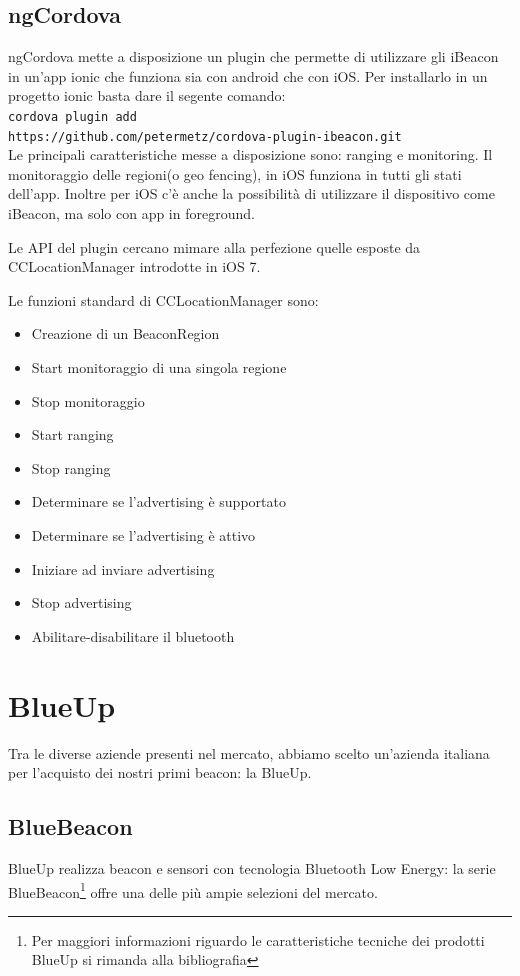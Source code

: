 \subsection{ngCordova}
ngCordova mette a disposizione un plugin che permette di utilizzare gli iBeacon in un'app ionic che funziona sia con android che con iOS.
Per installarlo in un progetto ionic basta dare il segente comando:\\
\texttt{cordova plugin add \\https://github.com/petermetz/cordova-plugin-ibeacon.git}\\
Le principali caratteristiche messe a disposizione sono: ranging e monitoring. Il monitoraggio delle regioni(o geo fencing), in iOS funziona in tutti gli stati dell'app.
Inoltre per iOS c'è anche la possibilità di utilizzare il dispositivo come iBeacon, ma solo con app in foreground.

Le API del plugin cercano mimare alla perfezione quelle esposte da CCLocationManager introdotte in iOS 7.

Le funzioni standard di CCLocationManager sono:
\begin{itemize}
\item Creazione di un BeaconRegion
\item Start monitoraggio di una singola regione
\item Stop monitoraggio
\item Start ranging
\item Stop ranging
\item Determinare se l'advertising è supportato
\item Determinare se l'advertising è attivo
\item Iniziare ad inviare advertising
\item Stop advertising
\item Abilitare-disabilitare il bluetooth
\end{itemize}

\section{BlueUp}
Tra le diverse aziende presenti nel mercato, abbiamo scelto un'azienda italiana per l'acquisto dei nostri primi beacon: la BlueUp.
\subsection{BlueBeacon}
BlueUp realizza beacon e sensori con tecnologia Bluetooth Low Energy: la serie BlueBeacon\footnote{Per maggiori informazioni riguardo le caratteristiche tecniche dei prodotti BlueUp si rimanda alla bibliografia\cite{blueup}} offre una delle più ampie selezioni del mercato. 

